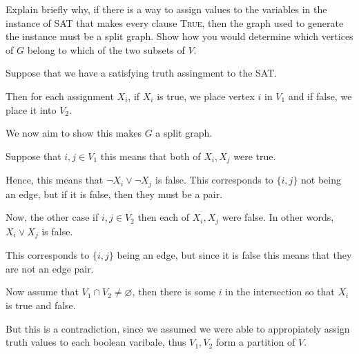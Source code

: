 \begin{questions}
	\question[3] Explain briefly why,  if there is a way to assign values  to the variables in the
	instance of SAT that  makes every clause \textsc{True}, then the  graph used to generate
	the instance must be  a split graph. Show how you would determine  which vertices of $G$
	belong to which of the two subsets of $V$.

	\begin{soln}
		Suppose that we have a satisfying truth assingment to the SAT.

		Then for each assignment \(X_i\), if \(X_i\) is true, we place vertex \(i\) in \(V_1\) and if false, we place it into \(V_2\).

		We now aim to show this makes \(G\) a split graph.

		Suppose that \(i, j \in V_1\) this means that both of \(X_i, X_j\) were true.

		Hence, this means that \(\lnot X_i \lor \lnot X_j\) is false. This corresponds to \(\{i, j\}\) not being an edge, but if it is false, then they must be a pair.

		Now, the other case if \(i, j \in V_2\) then each of \(X_i, X_j\) were false. In other words, \(X_i \lor X_j\) is false.

		This corresponds to \(\{i, j\}\) being an edge, but since it is false this means that they are not an edge pair.

		Now assume that \(V_1 \cap V_2 \neq \varnothing\), then there is some \(i\) in the intersection so that \(X_i\) is true and false.

		But this is a contradiction, since we assumed we were able to appropiately assign truth values to each boolean varibale, thus \(V_1, V_2\) form a partition of \(V\).

	\end{soln}

	\ifsolutions\fi
\end{questions}


